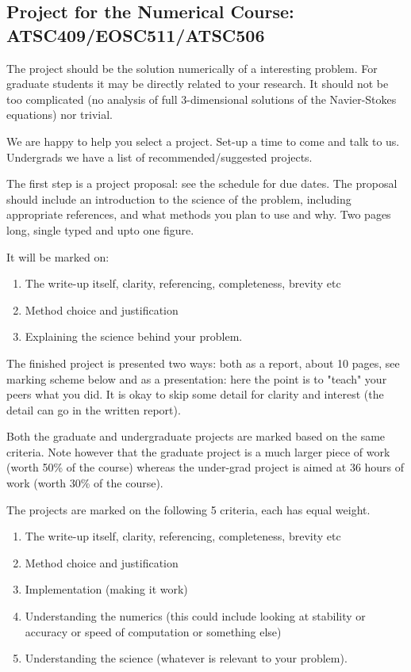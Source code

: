 \documentclass[12pt]{article}
\begin{document}
\subsection*{Project for the Numerical Course: ATSC409/EOSC511/ATSC506}

The project should be the solution numerically of a interesting
problem.  For graduate students it may be directly related to your
research.  It should not be too complicated (no analysis of full
3-dimensional solutions of the Navier-Stokes equations) nor trivial.

We are happy to help you select a project.  Set-up a time to come and
talk to us.  Undergrads we have a list of recommended/suggested projects.

The first step is a project proposal: see the schedule for due dates. The proposal should include an introduction to the science of the problem, including appropriate references, and what methods you plan to use and why. Two pages long, single typed and upto one figure.

It will be marked on:
\begin{enumerate}
\item The write-up itself, clarity, referencing, completeness, brevity etc
\item Method choice and justification
\item Explaining the science behind your problem.
\end{enumerate}

The finished project is presented two ways:
both as a report, about 10 pages, see marking scheme below and
as a presentation: here the point is to "teach" your peers what you
did.  It is okay to skip some detail for clarity and interest (the detail can go in the written report).

Both the graduate and undergraduate projects are marked based on the
same criteria.  Note however that the graduate project is a much
larger piece of work (worth 50\% of the course) whereas the under-grad
project is aimed at 36 hours of work (worth 30\% of the course).

The projects are marked on the following 5 criteria, each has equal weight.
\begin{enumerate}
\item The write-up itself, clarity, referencing, completeness, brevity
etc
\item Method choice and justification
\item Implementation (making it work)
\item Understanding the numerics  (this could include looking at stability or accuracy or speed of computation or something else)
\item Understanding the science (whatever is
relevant to your problem).
\end{enumerate}
\end{document}
